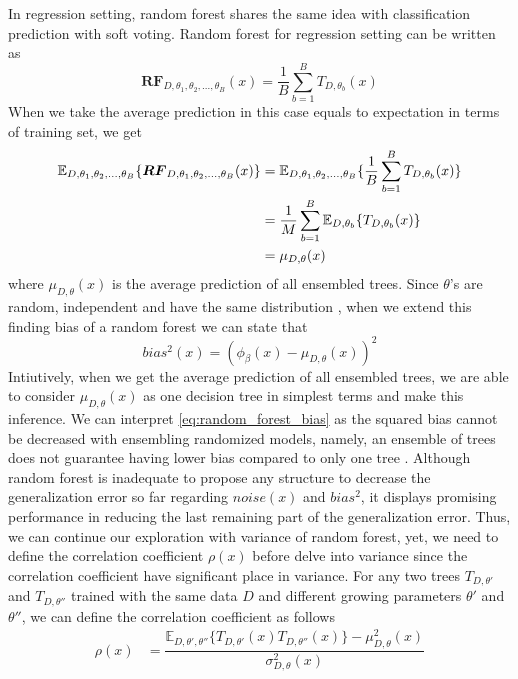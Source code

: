In regression setting, random forest shares the same idea with classification prediction with soft voting. 
Random forest for regression setting can be written as
\begin{equation}
\boldsymbol{RF}_{D, \theta_{1},\theta_{2},..., \theta_{B}}(x) = \dfrac{1}{B}\sum_{b = 1}^{B}T_{D,\theta_{b}}(x)
\end{equation}
When we take the average prediction in this case equals to expectation in terms of training set, we get
\begin{align}\label{eq:mu}
\mathbb{E}_{D, \theta_{1}, \theta_{2},..., \theta_{B}}\{\boldsymbol{RF}_{D, \theta_{1},\theta_{2},..., \theta_{B}}(x) \} 
	& = \mathbb{E}_{D, \theta_{1}, \theta_{2},..., \theta_{B}}\{\dfrac{1}{B}\sum_{b = 1}^{B}T_{D,\theta_{b}}(x)\} \notag \\
	& = \dfrac{1}{M}\sum_{b=1}^{B}\mathbb{E}_{D,\theta_{b}}\{T_{D, \theta_{b}}(x)\}\notag \\
	& = \mu_{D,\theta}(x)
\end{align}
where $\mu_{D,\theta}(x)$ is the average prediction of all ensembled trees. Since $\theta$'s are random, 
independent and have the same distribution \cite{louppe2014understanding}, when we extend this finding bias of a random forest 
we can state that 
\begin{equation}\label{eq:random_forest_bias}
bias^2(x) = (\phi_{\beta}(x) - \mu_{D,\theta}(x))^2
\end{equation}
Intiutively, when we get the average prediction of all ensembled trees, 
we are able to consider $\mu_{D,\theta}(x)$ as one decision tree in simplest terms and make this inference.
We can interpret \autoref{eq:random_forest_bias} as the squared bias cannot be decreased with ensembling randomized models, 
namely, an ensemble of trees does not guarantee having lower bias compared to only one tree \cite{friedman2001elements}.
Although random forest is inadequate to propose any structure to decrease the generalization error so far regarding $noise(x)$ 
and $bias^2$, it displays promising performance in reducing the last remaining part of the generalization error. 
Thus, we can continue our exploration with variance of random forest, yet, we need to define the correlation coefficient $\rho(x)$
before delve into variance since the correlation coefficient have significant place in variance. 
For any two trees $T_{D,\theta'}$ and $T_{D,\theta''}$ trained with the same data $D$
and different growing parameters $\theta'$ and $\theta''$, we can define the correlation coefficient as follows
\begin{align}
	\rho(x) & 
	= \dfrac{\mathbb{E}_{D,\theta',\theta''}\{T_{D,\theta'}(x) T_{D,\theta''}(x)\} 
	- \mu_{D,\theta}^2(x)}{\sigma_{D,\theta}^2(x)}
\end{align}
